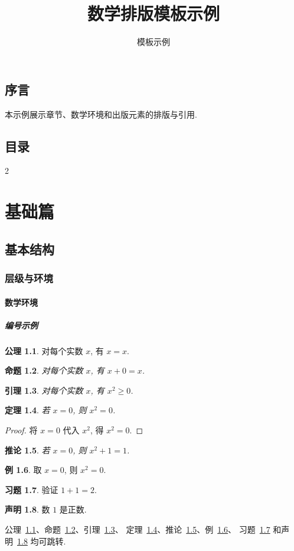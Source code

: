 \documentclass[UTF8,12pt,oneside,fontset=fandol]{ctexbook}
\makeatletter
\theoremstyle{mtfang}
\newtheorem{theorem}{定理}[chapter]
\newtheorem{proposition}[theorem]{命题}
\newtheorem{lemma}[theorem]{引理}
\newtheorem{corollary}[theorem]{推论}
\theoremstyle{definition}
\newtheorem{example}[theorem]{例}
\newtheorem{exercise}[theorem]{习题}
\newtheorem{claim}[theorem]{声明}
\newtheorem{axiom}[theorem]{公理}
\newcommand{\twocolcontents}{%
    \chapter*{目录}%
    \begin{multicols}{2}\@starttoc{toc}\end{multicols}}
\makeatother
\begin{document}
\title{数学排版模板示例}
\author{模板示例}
\date{}
\maketitle
\frontmatter
\chapter*{序言}
本示例展示章节、数学环境和出版元素的排版与引用.
\twocolcontents
\newpage
\mainmatter
\part{基础篇}

\chapter{基本结构}\label{ch:structure}
\section{层级与环境}\label{sec:env}
\subsection{数学环境}
\subsubsection{编号示例}
\begin{axiom}\label{ax:one}
    对每个实数 $x$, 有 $x = x$.
\end{axiom}
\begin{proposition}\label{prop:one}
    对每个实数 $x$, 有 $x + 0 = x$.
\end{proposition}
\begin{lemma}\label{lem:one}
    对每个实数 $x$, 有 $x^2 \geq 0$.
\end{lemma}
\begin{theorem}\label{thm:one}
    若 $x = 0$, 则 $x^2 = 0$.
\end{theorem}
\begin{proof}
    将 $x = 0$ 代入 $x^2$, 得 $x^2 = 0$.
\end{proof}
\begin{corollary}\label{cor:one}
    若 $x = 0$, 则 $x^2 + 1 = 1$.
\end{corollary}
\begin{example}\label{ex:one}
    取 $x = 0$, 则 $x^2 = 0$.
\end{example}
\begin{exercise}\label{exercise:one}
    验证 $1 + 1 = 2$.
\end{exercise}
\begin{claim}\label{claim:one}
    数 $1$ 是正数.
\end{claim}
公理~\ref{ax:one}、命题~\ref{prop:one}、引理~\ref{lem:one}、
定理~\ref{thm:one}、推论~\ref{cor:one}、例~\ref{ex:one}、
习题~\ref{exercise:one} 和声明~\ref{claim:one} 均可跳转.
\end{document}
